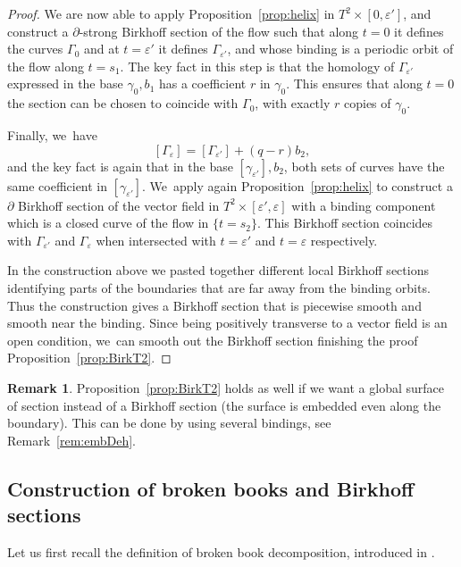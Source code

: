 \documentclass[10pt]{amsart}
\theoremstyle{definition}
\newtheorem{Remark}[theorem]{Remark}
\begin{document}
\begin{proof}
We are now able to apply Proposition~\ref{prop:helix} in $T^2\times [0,\varepsilon']$, and construct a $\partial$-strong Birkhoff section of the flow such that along $t=0$ it defines the curves $\Gamma_0$ and at $t=\varepsilon'$ it defines $\Gamma_{\varepsilon'}$, and whose binding is a periodic orbit of the flow along $t=s_1$. The key fact in this step is that the homology of $\Gamma_{\varepsilon'}$ expressed in the base $\gamma_0, b_1$ has a coefficient $r$ in $\gamma_0$. This ensures that along $t=0$ the section can be chosen to coincide with $\Gamma_0$, \ie with exactly $r$ copies of $\gamma_0$.

Finally, we~have
\[
[\Gamma_\varepsilon]= [\Gamma_{\varepsilon'}]+ (q-r)b_2,
\]
and the key fact is again that in the base $[\gamma_{\varepsilon'}], b_2$, both sets of curves have the same coefficient in $[\gamma_{\varepsilon'}]$. We~apply again Proposition~\ref{prop:helix} to construct a $\partial$ Birkhoff section of the vector field in $T^2\times [\varepsilon',\varepsilon]$ with a binding component which is a closed curve of the flow in $\{t=s_2\}$. This Birkhoff section coincides with $\Gamma_{\varepsilon'}$ and $\Gamma_{\varepsilon}$ when intersected with $t=\varepsilon'$ and $t=\varepsilon$ respectively.

In the construction above we pasted together different local Birkhoff sections identifying parts of the boundaries that are far away from the binding orbits. Thus the construction gives a Birkhoff section that is piecewise smooth and smooth near the binding. Since being positively transverse to a vector field is an open condition, we~can smooth out the Birkhoff section finishing the proof Proposition~\ref{prop:BirkT2}.
\end{proof}

\begin{Remark}
Proposition~\ref{prop:BirkT2} holds as well if we want a global surface of section instead of a Birkhoff section (\ie the surface is embedded even along the boundary). This can be done by using several bindings, see Remark~\ref{rem:embDeh}.
\end{Remark}

\subsection{Construction of broken books and Birkhoff sections} \label{sec:bbook}

Let us first recall the definition of broken book decomposition, introduced in \cite{CDR}.
\end{document}
